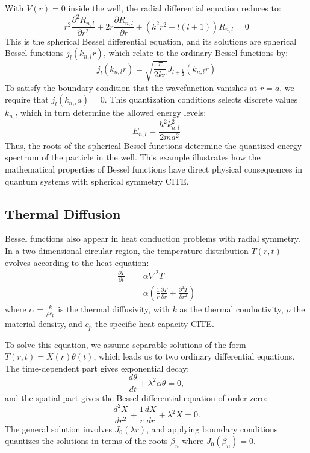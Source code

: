 \documentclass[linenumbers, twocolumn]{aastex631}
\begin{document}
\noindent With $V(r)=0$ inside the well, the radial differential equation
reduces to:
\begin{equation}
    r^2\frac{\partial^2 R_{n,l}}{\partial r^2} + 2r\frac{\partial R_{n,l}}{\partial r} +(k^2r^2-l(l+1))R_{n,l}=0
\end{equation}
\noindent This is the spherical Bessel differential equation, and its solutions
are spherical Bessel functions $j_l(k_{n,l}r)$, which relate to the ordinary
Bessel functions by:
\begin{equation}
    j_l(k_{n,l}r)=\sqrt{\frac{\pi}{2kr}}J_{l+\frac{1}{2}}(k_{n,l}r)
\end{equation}
\noindent To satisfy the boundary condition that the wavefunction vanishes at
$r=a$, we require that $j_l(k_{n,l}a)=0$. This quantization conditions selects
discrete values $k_{n,l}$ which in turn determine the allowed energy levels:
\begin{equation}
    E_{n,l}=\frac{\hbar^2k_{n,l}^2}{2ma^2}
\end{equation}
\noindent Thus, the roots of the spherical Bessel functions determine the
quantized energy spectrum of the particle in the well. This example illustrates how
the mathematical properties of Bessel functions have direct physical 
consequences in quantum systems with spherical symmetry CITE.\\


\subsection{Thermal Diffusion}

Bessel functions also appear in heat conduction problems with radial symmetry.
In a two-dimensional circular region, the temperature distribution $T(r,t)$
evolves according to the heat equation:
\begin{align}
    \frac{\partial T}{\partial t}&=\alpha\nabla^2T\\
    &=\alpha\left(\frac{1}{r} \frac{\partial T}{\partial r} + \frac{\partial^2 T}{\partial r^2}\right)
\end{align}
\noindent where  $\alpha=\frac{k}{\rho c_p}$ is the thermal diffusivity, with
$k$ as the thermal conductivity, $\rho$ the material density, and $c_p$ the
specific heat capacity CITE.

\noindent To solve this equation, we assume separable solutions of the form
$T(r,t)=X(r)\theta(t)$, which leads us to two ordinary differential equations.
The time-dependent part gives exponential decay:
\begin{equation}
    \frac{d\theta}{dt}+\lambda^2\alpha\theta=0,
\end{equation}
\noindent and the spatial part gives the Bessel differential equation
of order zero:
\begin{equation}
    \frac{d^2X}{dr^2}+\frac{1}{r}\frac{dX}{dr}+\lambda^2X=0.
\end{equation}
\noindent The general solution involves $J_0(\lambda r)$, and applying boundary
conditions quantizes the solutions in terms of the roots $\beta_n$ where
$J_0(\beta_n)=0$.
\end{document}
